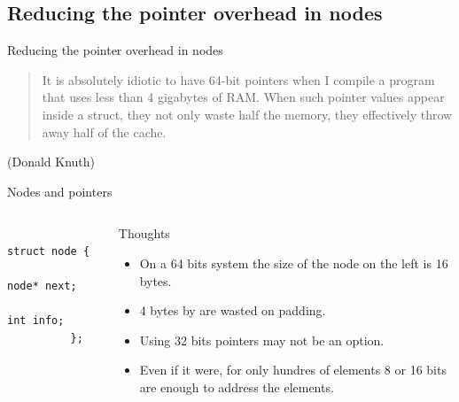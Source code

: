 \documentclass[10pt,aspectratio=169]{beamer}
\begin{document}
\subsection{Reducing the pointer overhead in nodes}

\begin{frame}[fragile]{Reducing the pointer overhead in nodes}
\begin{quotation}
\noindent
It is absolutely idiotic to have 64-bit pointers when I compile a program that
uses less than 4 gigabytes of RAM. When such pointer values appear inside a
struct, they not only waste half the memory, they effectively throw away half
of the cache.
\end{quotation}
(Donald Knuth)
\end{frame}

\begin{frame}[fragile]{Nodes and pointers}
\begin{columns}
\begin{column}{0.5\textwidth}

\begin{lstlisting}
          struct node {
            node* next;
            int info;
          };
\end{lstlisting}
\end{column}
\begin{column}{0.5\textwidth}
\begin{block}{Thoughts}
\begin{itemize}
\item On a 64 bits system the size of the node on the left is 16 bytes.
\item 4 bytes by are wasted on padding.
\item Using 32 bits pointers may not be an option.
\item Even if it were, for only hundres of elements
8 or 16 bits are enough to address the elements.
\end{itemize}
\end{block}

\end{column}
\end{columns}

\end{frame}
\end{document}

